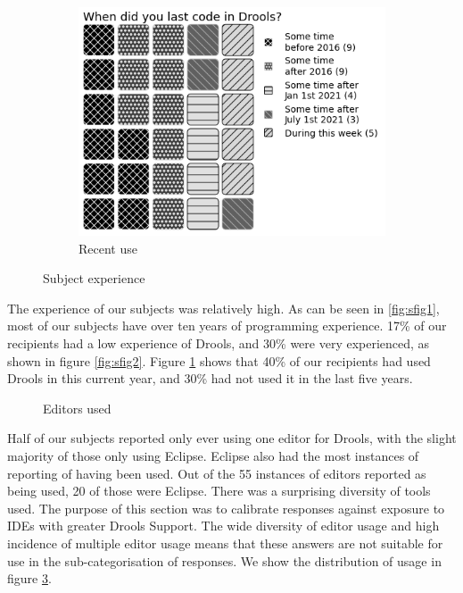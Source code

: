 \begin{figure}
\begin{subfigure}{.33\textwidth}
        \includegraphics[width=.95\linewidth]{Sections/images/pie_recentusage4.png}
        \caption{Recent use}
        \label{fig:sfig3}
      \end{subfigure}
    \caption{Subject experience}
    \label{fig:subject_experience}
\end{figure}

The experience of our subjects was relatively high.
As can be seen in \ref{fig:sfig1}, most of our subjects have over ten years of programming experience.
17\% of our recipients had a low experience of Drools, and 30\% were very experienced, as shown in figure \ref{fig:sfig2}.
Figure \ref{fig:sfig3} shows that 40\% of our recipients had used Drools in this current year, and 30\% had not used it in the last five years.

\begin{figure}
    \centering
    \caption{Editors used}
    \label{fig:editorUsage}
\end{figure}

Half of our subjects reported only ever using one editor for Drools, with the slight majority of those only using Eclipse.
Eclipse also had the most instances of reporting of having been used.
Out of the 55 instances of editors reported as being used, 20 of those were Eclipse.
There was a surprising diversity of tools used.
The purpose of this section was to calibrate responses against exposure to IDEs with greater Drools Support.
The wide diversity of editor usage and high incidence of multiple editor usage means that these answers are not suitable for use in the sub-categorisation of responses. 
We show the distribution of usage in figure \ref{fig:editorUsage}.

